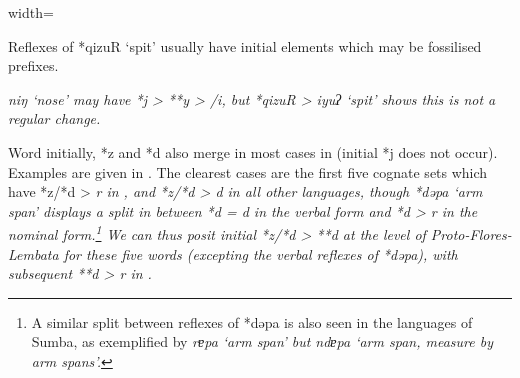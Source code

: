 \begin{table}
\begin{adjustbox}{width=\textwidth}
\begin{threeparttable}
		\begin{tablenotes}\tnsize
			\item[†]	{Reflexes of *qizuR ‘spit’ usually have initial elements which
								may be fossilised prefixes.}
			\item[‡]	{ \it{niŋ} ‘nose’ may have *j > **y > {\0} /i{\gap},
								but *qizuR > \it{iyuʔ} ‘spit’ shows this is not a regular change.}
		\end{tablenotes}
	\end{threeparttable}
\end{adjustbox}
\end{table}

Word initially, *z and *d also merge in most cases in 
(initial *j does not occur).
Examples are given in .
The clearest cases are the first five cognate sets which have
*z/*d > \it{r} in ,
and *z/*d > \it{d} in all other languages,
though *dəpa ‘arm span’ displays a split in  between
*d = \it{d} in the verbal form
and *d > \it{r} in the nominal form.\footnote{
		A similar split between reflexes of *dəpa is also seen in the
		languages of Sumba, as exemplified by  \it{rɐpa} ‘arm span’
		but \it{ndɐpa} ‘arm span,
		measure by arm spans’.}
We can thus posit
initial *z/*d > **d at the level of Proto-Flores-Lembata
for these five words (excepting the verbal reflexes of *dəpa),
with subsequent **d > \it{r} in .

